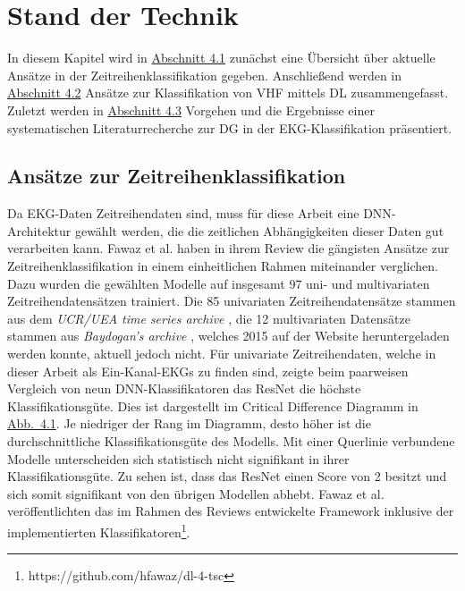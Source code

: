 \chapter{Stand der Technik}\label{chap:sdt}

In diesem Kapitel wird in \hyperref[sec:InceptionTime]{Abschnitt 4.1} zunächst eine Übersicht über aktuelle Ansätze in der Zeitreihenklassifikation gegeben. Anschließend werden in \hyperref[sec:DLEKG]{Abschnitt 4.2} Ansätze zur Klassifikation von \gls{VHF} mittels \gls{DL} zusammengefasst. Zuletzt werden in \hyperref[sec:DGEKG]{Abschnitt 4.3} Vorgehen und die Ergebnisse einer systematischen Literaturrecherche zur \gls{DG} in der \gls{EKG}-Klassifikation präsentiert.

\section{Ansätze zur Zeitreihenklassifikation}\label{sec:InceptionTime}


Da \gls{EKG}-Daten Zeitreihendaten sind, muss für diese Arbeit eine \gls{DNN}-Architektur gewählt werden, die die zeitlichen Abhängigkeiten dieser Daten gut verarbeiten kann.
Fawaz et al. \cite{ismail_fawaz_deep_2019} haben in ihrem Review die gängisten Ansätze zur Zeitreihenklassifikation in einem einheitlichen Rahmen miteinander verglichen. Dazu wurden die gewählten Modelle auf insgesamt 97 uni- und multivariaten Zeitreihendatensätzen trainiert. Die 85 univariaten Zeitreihendatensätze stammen aus dem \textit{\gls{UCR}\slash\gls{UEA} time series archive} \cite{dau_ucr_2019} \cite{bagnall_great_2017}, die 12 multivariaten Datensätze stammen aus \textit{Baydogan's archive} \cite{baydogan_symbolic_2022}, welches 2015 auf der Website heruntergeladen werden konnte, aktuell jedoch nicht. Für univariate Zeitreihendaten, welche in dieser Arbeit als Ein-Kanal-\gls{EKG}s zu finden sind, zeigte beim paarweisen Vergleich von neun \gls{DNN}-Klassifikatoren das \gls{ResNet} die höchste Klassifikationsgüte. Dies ist dargestellt im Critical Difference Diagramm in \hyperref[fig:CritDiffReview]{Abb.~4.1}. Je niedriger der Rang im Diagramm, desto höher ist die durchschnittliche Klassifikationsgüte des Modells. Mit einer Querlinie verbundene Modelle unterscheiden sich statistisch nicht signifikant in ihrer Klassifikationsgüte. Zu sehen ist, dass das \gls{ResNet} einen Score von 2 besitzt und sich somit signifikant von den übrigen Modellen abhebt. Fawaz et al. veröffentlichten das im Rahmen des Reviews entwickelte Framework inklusive der implementierten Klassifikatoren\footnote{https://github.com/hfawaz/dl-4-tsc}. \cite{ismail_fawaz_deep_2019}

